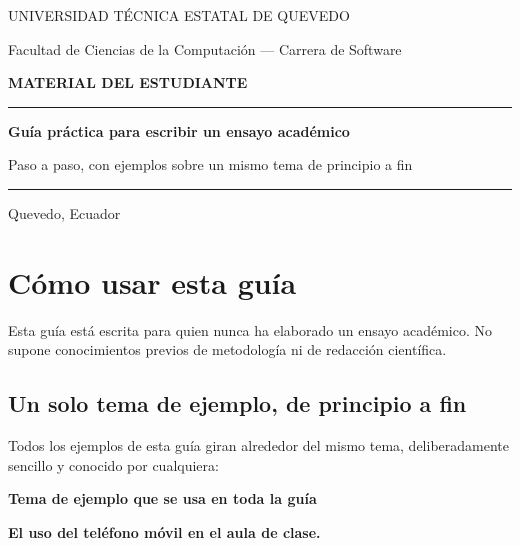 \documentclass[12pt,a4paper,openany]{report}
\newenvironment{aviso}[1]
	{\begin{lrbox}{\cajaguardada}\begin{minipage}{\dimexpr\textwidth-2\fboxsep\relax}\vspace{4pt}\textbf{\sffamily\small #1}\par\vspace{3pt}\small}
	{\vspace{4pt}\end{minipage}\end{lrbox}\par\vspace{4pt}\noindent\colorbox{grisclaro}{\usebox{\cajaguardada}}\par\vspace{8pt}}
\begin{document}
\begin{titlepage}
	\centering
	\vspace*{1.5cm}
	{\sffamily\large\color{grismedio} UNIVERSIDAD T\'ECNICA ESTATAL DE QUEVEDO\par}
	{\sffamily\normalsize\color{grismedio} Facultad de Ciencias de la Computaci\'on --- Carrera de Software\par}
	\vspace{2.5cm}
	{\sffamily\Large\bfseries\color{azulinstitucional} MATERIAL DEL ESTUDIANTE\par}
	\vspace{1.0cm}
	\rule{\textwidth}{1.2pt}
	\vspace{0.8cm}
	{\sffamily\LARGE\bfseries Gu\'ia pr\'actica para escribir un ensayo acad\'emico\par}
	\vspace{0.5cm}
	{\sffamily\large Paso a paso, con ejemplos sobre un mismo tema de principio a fin\par}
	\vspace{0.8cm}
	\rule{\textwidth}{1.2pt}
	\vfill
	{\normalsize\color{grismedio} Quevedo, Ecuador\par}
	\vspace{1.5cm}
\end{titlepage}

\tableofcontents
\clearpage
{}

\chapter{C\'omo usar esta gu\'ia}

Esta gu\'ia est\'a escrita para quien nunca ha elaborado un ensayo acad\'emico. No supone conocimientos previos de metodolog\'ia ni de redacci\'on cient\'ifica.

\section{Un solo tema de ejemplo, de principio a fin}

Todos los ejemplos de esta gu\'ia giran alrededor del mismo tema, deliberadamente sencillo y conocido por cualquiera:

\begin{aviso}{Tema de ejemplo que se usa en toda la gu\'ia}
\textbf{El uso del tel\'efono m\'ovil en el aula de clase.}
\end{aviso}
\end{document}
